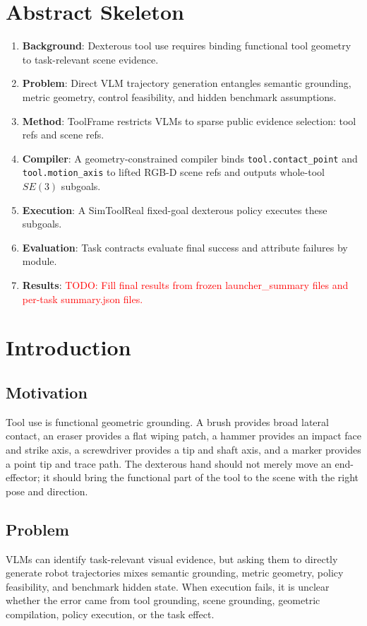 \documentclass[journal]{IEEEtran}
\newcommand{\todo}[1]{\textcolor{red}{TODO: #1}}
\newcommand{\method}{ToolFrame}
\begin{document}
\section{Abstract Skeleton}
\begin{enumerate}
  \item \textbf{Background}: Dexterous tool use requires binding functional
  tool geometry to task-relevant scene evidence.
  \item \textbf{Problem}: Direct VLM trajectory generation entangles semantic
  grounding, metric geometry, control feasibility, and hidden benchmark
  assumptions.
  \item \textbf{Method}: \method{} restricts VLMs to sparse public evidence
  selection: tool refs and scene refs.
  \item \textbf{Compiler}: A geometry-constrained compiler binds
  \texttt{tool.contact\_point} and \texttt{tool.motion\_axis} to lifted RGB-D
  scene refs and outputs whole-tool $SE(3)$ subgoals.
  \item \textbf{Execution}: A SimToolReal fixed-goal dexterous policy executes
  these subgoals.
  \item \textbf{Evaluation}: Task contracts evaluate final success and
  attribute failures by module.
  \item \textbf{Results}: \todo{Fill final results from frozen
  launcher\_summary files and per-task summary.json files.}
\end{enumerate}

\section{Introduction}
\subsection{Motivation}
Tool use is functional geometric grounding. A brush provides broad lateral
contact, an eraser provides a flat wiping patch, a hammer provides an impact
face and strike axis, a screwdriver provides a tip and shaft axis, and a marker
provides a point tip and trace path. The dexterous hand should not merely move
an end-effector; it should bring the functional part of the tool to the scene
with the right pose and direction.

\subsection{Problem}
VLMs can identify task-relevant visual evidence, but asking them to directly
generate robot trajectories mixes semantic grounding, metric geometry, policy
feasibility, and benchmark hidden state. When execution fails, it is unclear
whether the error came from tool grounding, scene grounding, geometric
compilation, policy execution, or the task effect.
\end{document}
